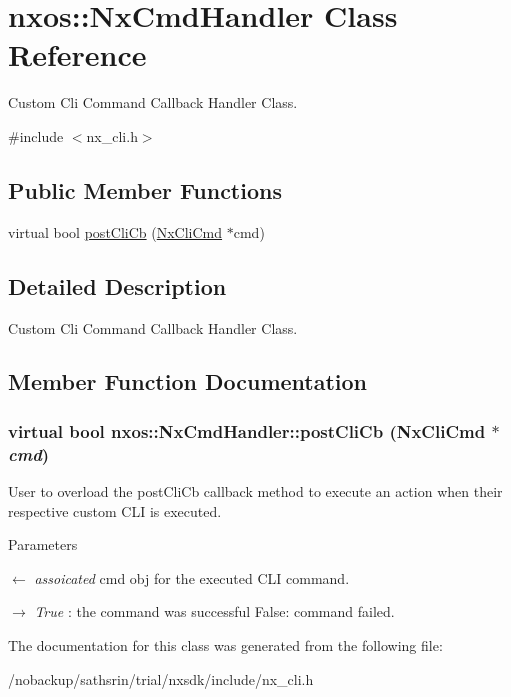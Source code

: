 \hypertarget{classnxos_1_1NxCmdHandler}{
\section{nxos::NxCmdHandler Class Reference}
\label{classnxos_1_1NxCmdHandler}
}


Custom Cli Command Callback Handler Class.  


{\ttfamily \#include $<$nx\_\-cli.h$>$}\subsection*{Public Member Functions}
\begin{DoxyCompactItemize}
\item 
virtual bool \hyperlink{classnxos_1_1NxCmdHandler_ab60a4672e08b1acd1faa249936963ead}{postCliCb} (\hyperlink{classnxos_1_1NxCliCmd}{NxCliCmd} $\ast$cmd)
\end{DoxyCompactItemize}


\subsection{Detailed Description}
Custom Cli Command Callback Handler Class. 

\subsection{Member Function Documentation}
\hypertarget{classnxos_1_1NxCmdHandler_ab60a4672e08b1acd1faa249936963ead}{
\subsubsection[{postCliCb}]{\setlength{\rightskip}{0pt plus 5cm}virtual bool nxos::NxCmdHandler::postCliCb ({\bf NxCliCmd} $\ast$ {\em cmd})}}
\label{classnxos_1_1NxCmdHandler_ab60a4672e08b1acd1faa249936963ead}
User to overload the postCliCb callback method to execute an action when their respective custom CLI is executed. 
\begin{DoxyParams}{Parameters}
\item[\mbox{$\leftarrow$} {\em assoicated}]cmd obj for the executed CLI command. \item[\mbox{$\rightarrow$} {\em True}]: the command was successful False: command failed. \end{DoxyParams}


The documentation for this class was generated from the following file:\begin{DoxyCompactItemize}
\item 
/nobackup/sathsrin/trial/nxsdk/include/nx\_\-cli.h\end{DoxyCompactItemize}
